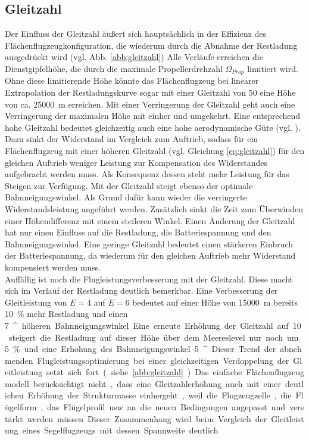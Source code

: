 \subsection{Gleitzahl}
\label{subsec:gleitzahl}
Der Einfluss der Gleitzahl äußert sich hauptsächlich in der Effizienz des Flächenflugzeugkonfiguration, die wiederum durch die Abnahme der Restladung ausgedrückt wird (vgl. Abb. \ref{abb:gleitzahl})
Alle Verläufe erreichen die Dienstgipfelhöhe, die durch die maximale Propellerdrehzahl \ensuremath{\Omega_{Prop}} limitiert wird. Ohne diese limitierende Höhe könnte das Flächenflugzeug bei linearer Extrapolation der Restladungskurve sogar mit einer Gleitzahl von 50 eine Höhe von ca. \SI{25000}{m} erreichen. 
Mit einer Verringerung der Gleitzahl geht auch eine Verringerung der maximalen Höhe mit einher und umgekehrt. Eine entsprechend hohe Gleitzahl bedeutet gleichzeitig auch eine hohe aerodynamische Güte (vgl. \cite[S.34]{Scheiderer.2008}). Dazu sinkt der Widerstand im Vergleich zum Auftrieb, sodass für ein Flächenflugzeug mit einer höheren Gleitzahl (vgl. Gleichung \eqref{eq:gleitzahl}) für den gleichen Auftrieb weniger Leistung zur Kompensation des Widerstandes aufgebracht werden muss. Als Konsequenz dessen steht mehr Leistung für das Steigen zur Verfügung. Mit der Gleitzahl steigt ebenso der optimale Bahnneigungswinkel. Als Grund dafür kann wieder die verringerte Widerstandsleistung angeführt werden. Zusätzlich sinkt die Zeit zum Überwinden einer Höhendifferenz mit einem steileren Winkel. Einen Änderung der Gleitzahl hat nur einen Einfluss auf die Restladung, die Batteriespannung und den Bahnneigungswinkel. Eine geringe Gleitzahl bedeutet einen stärkeren Einbruch der Batteriespannung, da wiederum für den gleichen Auftrieb mehr Widerstand kompensiert werden muss. \\
Auffällig ist noch die Flugleistungsverbesserung mit der Gleitzahl. Diese macht sich im Verlauf der Restladung deutlich bemerkbar. Eine Verbesserung der Gleitleistung von \ensuremath{E = 4} auf \ensuremath{E = 6} bedeutet auf einer Höhe von \SI{15000}{m} bereits \SI{10}{\%} mehr Restladung und einen \SI{7}{^\circ} höheren Bahnneigungswinkel. Eine erneute Erhöhung der Gleitzahl auf 10 steigert die Restladung auf dieser Höhe über dem  Meereslevel nur noch um \SI{5}{\%} und eine Erhöhung des Bahnneigungswinkel \SI{5}{^\circ}. Dieser Trend der abnehmenden Flugleistungsoptimierung bei einer gleichzeitigen Verdoppelung der Gleitleistung setzt sich fort (siehe \ref{abb:gleitzahl}).
Das einfache Flächenflugzeugmodell berücksichtigt nicht, dass eine Gleitzahlerhöhung auch mit einer deutlichen Erhöhung der Strukturmasse einhergeht, weil die Flugzeugzelle, die Flügelform, das Flügelprofil usw. an die neuen Bedingungen angepasst und verstärkt werden müssen. Dieser Zusammenhang wird beim Vergleich der Gleitleistung eines Segelflugzeugs mit dessen Spannweite deutlich. \\
